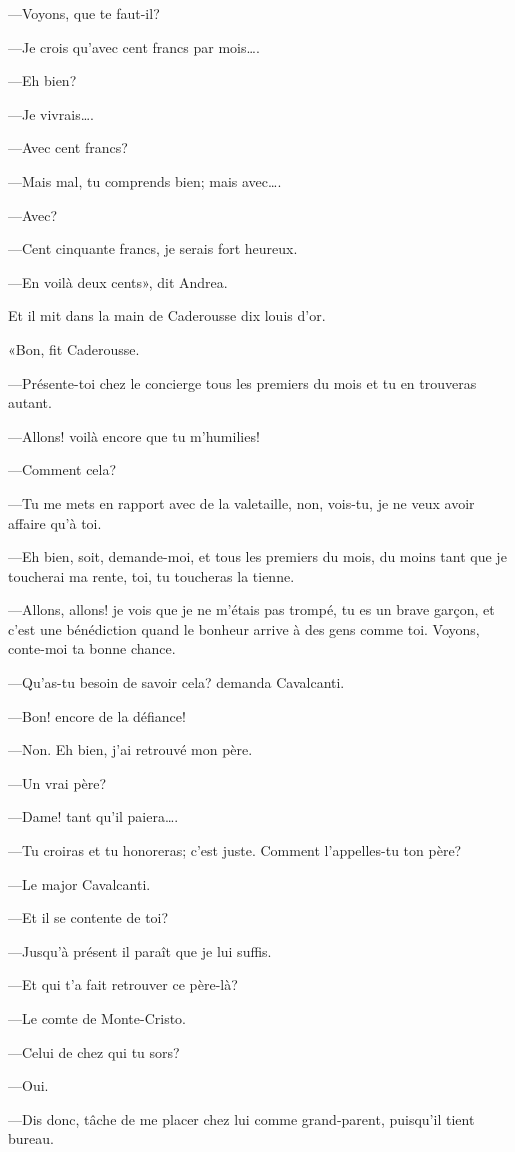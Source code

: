 —Voyons, que te faut-il? 

—Je crois qu'avec cent francs par mois\dots. 

—Eh bien? 

—Je vivrais\dots. 

—Avec cent francs? 

—Mais mal, tu comprends bien; mais avec\dots. 

—Avec? 

—Cent cinquante francs, je serais fort heureux. 

—En voilà deux cents», dit Andrea. 

Et il mit dans la main de Caderousse dix louis d'or. 

«Bon, fit Caderousse. 

—Présente-toi chez le concierge tous les premiers du mois et tu en trouveras autant. 

—Allons! voilà encore que tu m'humilies! 

—Comment cela? 

—Tu me mets en rapport avec de la valetaille, non, vois-tu, je ne veux avoir affaire qu'à toi. 

—Eh bien, soit, demande-moi, et tous les premiers du mois, du moins tant que je toucherai ma rente, toi, tu toucheras la tienne. 

—Allons, allons! je vois que je ne m'étais pas trompé, tu es un brave garçon, et c'est une bénédiction quand le bonheur arrive à des gens comme toi. Voyons, conte-moi ta bonne chance. 

—Qu'as-tu besoin de savoir cela? demanda Cavalcanti. 

—Bon! encore de la défiance! 

—Non. Eh bien, j'ai retrouvé mon père. 

—Un vrai père? 

—Dame! tant qu'il paiera\dots. 

—Tu croiras et tu honoreras; c'est juste. Comment l'appelles-tu ton père? 

—Le major Cavalcanti. 

—Et il se contente de toi? 

—Jusqu'à présent il paraît que je lui suffis. 

—Et qui t'a fait retrouver ce père-là? 

—Le comte de Monte-Cristo. 

—Celui de chez qui tu sors? 

—Oui. 

—Dis donc, tâche de me placer chez lui comme grand-parent, puisqu'il tient bureau. 

